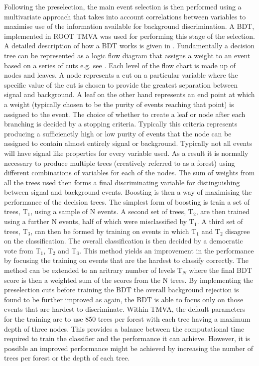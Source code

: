 Following the preselection, the main event selection is then performed using a multivariate approach that takes into account correlations between variables to maximise use of the information available for background discrimination. A \ac{BDT}, implemented in ROOT TMVA \cite{2007physics...3039H} was used for performing this stage of the selection. A detailed description of how a BDT works is given in \cite{Coadou:2013lca}. Fundamentally a decision tree can be represented as a logic flow diagram that assigns a weight to an event based on a series of cuts e.g. see . Each level of the flow chart is made up of nodes and leaves. A node represents a cut on a particular variable where the specific value of the cut is chosen to provide the greatest separation between signal and background. A leaf on the other hand represents an end point at which a weight (typically chosen to be the purity of events reaching that point) is assigned to the event. The choice of whether to create a leaf or node after each branching is decided by a stopping criteria. Typically this criteria represents producing a sufficienctly high or low purity of events that the node can be assigned to contain almost entirely signal or background. Typically not all events will have signal like properties for every variable used. As a result it is normally necessary to produce multiple trees (creatively referred to as a forest) using different combinations of variables for each of the nodes. The sum of weights from all the trees used then forms a final discriminating variable for distinguishing between signal and background events. Boosting is then a way of maximising the performance of the decision trees. The simplest form of boosting is train a set of trees, T$_1$, using a sample of N events. A second set of trees, T$_2$, are then trained using a further N events, half of which were misclassified by T$_1$. A third set of trees, T$_3$,  can then be formed by training on events in which T$_1$ and T$_2$ disagree on the classification. The overall classification is then decided by a democratic vote from T$_1$, T$_2$ and T$_3$. This method yields an improvement in the performance by focusing the training on events that are the hardest to classify correctly. The method can be extended to an aritrary number of levels T$_N$ where the final \ac{BDT} score is then a weighted sum of the scores from the N trees. By implementing the preselection cuts before training the \ac{BDT} the overall background rejection is found to be further improved as again, the \ac{BDT} is able to focus only on those events that are hardest to discriminate. Within TMVA, the default parameters for the training are to use 850 trees per forest with each tree having a maximum depth of three nodes. This provides a balance between the computational time required to train the classifier and the performance it can achieve. However, it is possible an improved performance might be achieved by increasing the number of trees per forest or the depth of each tree. 

